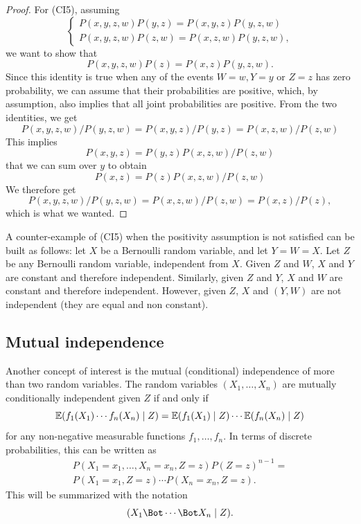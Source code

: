 \begin{proof}
\medskip

For (CI5), assuming
\begin{equation}
\label{eq:ci5.assum}
\begin{cases}
P(x,y,z,w)P(y,z) = P(x, y,z)P(y,z,w)\\
P(x,y,z,w)P(z,w) = P(x,z,w)P(y,z,w),
\end{cases}
\end{equation}
we want to show that 
$$
P(x,y,z,w)P(z) = P(x,z)P(y,z,w).
$$
Since this identity is  true when any of the events $W=w,
Y=y$ or $Z=z$ has zero probability, we can assume that their
probabilities are positive, which, by assumption, also implies that all
joint probabilities are positive. From the two identities, we get
\[
P(x,y,z,w)/P(y,z,w) = 
P(x, y,z)/P(y,z)  = P(x,z,w)/P(z,w)
\]
This implies
\[
P(x,y,z) = P(y,z) P(x,z,w)/P(z,w)
\]
that we can sum over $y$ to obtain
\[
P(x, z) = P(z)P(x,z,w)/P(z,w)
\]
We therefore get
\[
P(x,y,z,w)/P(y,z,w) = 
 P(x,z,w)/P(z,w) = P(x,z)/P(z),
\]
which is what we wanted.
\end{proof}

A counter-example of (CI5) when the positivity assumption is not satisfied can be built as follows:
let $X$ be a Bernoulli random variable, and let $Y=W=X$. Let $Z$ be any
Bernoulli random variable, independent from $X$. Given $Z$ and $W$,
$X$ and $Y$ are constant and therefore independent. Similarly, given $Z$ and $Y$,
$X$ and $W$ are constant and therefore independent. However,
given $Z$, $X$ and $(Y,W)$ are not independent (they are equal and non
constant).

\subsection{Mutual independence}

Another concept of interest is the mutual (conditional) independence
of more than two random variables. The random variables
$(X_1, \ldots, X_n)$ are mutually conditionally independent given $Z$
if and only if 
$$
\bm{\mathbb E}(f_1(X_1)\cdots f_n(X_n)\mid Z) = \bm{\mathbb E}(f_1(X_1)\mid Z)\cdots \bm{\mathbb E}(f_n(X_n)\mid Z)
$$
for any non-negative measurable functions $f_1, \ldots, f_n$. In terms of discrete
probabilities, this can be written as
\begin{multline*}
P(X_1=x_1, \ldots, X_n=x_n, Z=z) P(Z=z)^{n-1} = \\
P(X_1=x_1, Z=z) \cdots
P(X_n=x_n, Z=z).
\end{multline*}
This will be summarized with the notation
\[
(X_1 \indp \cdots \indp X_n\mid Z).
\]


